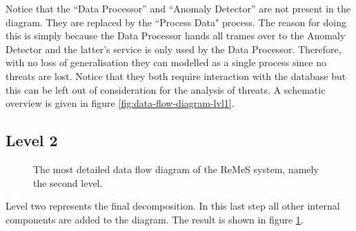 \npar Notice that the ``Data Processor'' and ``Anomaly Detector'' are not
present in the diagram. They are replaced by the ``Process Data" process. The reason for
doing this is simply because the Data Processor hands all trames over to the
Anomaly Detector and the latter's service is only used by the Data Processor.
Therefore, with no loss of generalisation they can modelled as a single process
since no threats are lost. Notice that they both require interaction with the
database but this can be left out of consideration for the analysis of threats. 
A schematic overview is given in figure \ref{fig:data-flow-diagram-lvl1}.

\subsection{Level 2}

\begin{figure}[H]
	\begin{centering}
		\caption{The most detailed data flow diagram of the ReMeS system, namely the
		second level.}
		\label{fig:data-flow-diagram-lvl2}
	\end{centering}
\end{figure}

\npar Level two represents the final decomposition. In this last step all
other internal components are added to the diagram. The result is shown in
figure \ref{fig:data-flow-diagram-lvl2}.
